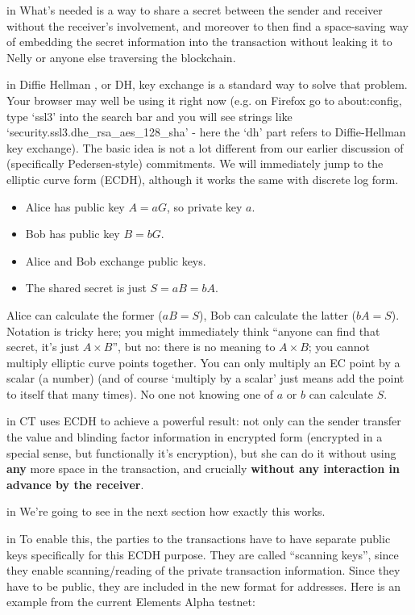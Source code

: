 \documentclass[10pt,a4paper]{article}
\begin{document}
 in \noindent What's needed is a way to share a secret between the sender and receiver without the receiver's involvement, and moreover to then find a space-saving way of embedding the secret information into the transaction without leaking it to Nelly or anyone else traversing the blockchain.

 in \noindent Diffie Hellman \cite{dhke}, or DH, key exchange is a standard way to solve that problem. Your browser may well be using it right now (e.g. on Firefox go to about:config, type `ssl3' into the search bar and you will see strings like `security.ssl3.dhe\_rsa\_aes\_128\_sha' - here the `dh' part refers to Diffie-Hellman key exchange). The basic idea is not a lot different from our earlier discussion of (specifically Pedersen-style) commitments. We will immediately jump to the elliptic curve form (ECDH), although it works the same with discrete log form.

\begin{itemize}
\item Alice has public key $A = aG$, so private key $a$.
\item Bob has public key $B = bG$.
\item Alice and Bob exchange public keys.
\item The shared secret is just $S = aB = bA$.
\end{itemize}

Alice can calculate the former ($aB = S$), Bob can calculate the latter ($bA = S$). Notation is tricky here; you might immediately think ``anyone can find that secret, it's just $A \times B$'', but no: there is no meaning to $A \times B$; you cannot multiply elliptic curve points together. You can only multiply an EC point by a scalar (a number) (and of course `multiply by a scalar' just means add the point to itself that many times). No one not knowing one of $a$ or $b$ can calculate $S$.

 in \noindent CT uses ECDH to achieve a powerful result: not only can the sender transfer the value and blinding factor information in encrypted form (encrypted in a special sense, but functionally it's encryption), but she can do it without using \textbf{any} more space in the transaction, and crucially \textbf{without any interaction in advance by the receiver}.

 in \noindent We're going to see in the next section how exactly this works.

 in \noindent To enable this, the parties to the transactions have to have separate public keys specifically for this ECDH purpose. They are called ``scanning keys'', since they enable scanning/reading of the private transaction information. Since they have to be public, they are included in the new format for addresses. Here is an example from the current Elements Alpha testnet:
\end{document}
